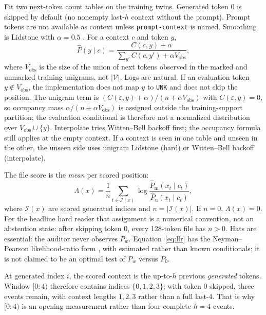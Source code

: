 \documentclass[11pt,a4paper]{article}
\theoremstyle{definition}
\newcommand{\V}{\mathcal{V}}
\newcommand{\LLR}{\Lambda}
\newcommand{\Phatm}{\hat{P}_{\mathrm{m}}}
\newcommand{\Phatu}{\hat{P}_{\mathrm{u}}}
\newcommand{\hist}{h}
\begin{document}
Fit two next-token count tables on the training twins. Generated token
$0$ is skipped by default (no nonempty last-$\hist$ context without the
prompt). Prompt tokens are not available as context unless
\texttt{prompt-context} is named. Smoothing is Lidstone with
$\alpha=0.5$ \citep{lidstone1920note}. For a context $c$ and token $y$,
\begin{equation}
\hat P(y \mid c)
= \frac{C(c,y)+\alpha}{\sum_{y'} C(c,y') + \alpha V_{\mathrm{obs}}},
\label{eq:lidstone}
\end{equation}
where $V_{\mathrm{obs}}$ is the size of the union of next tokens observed in the marked
and unmarked training unigrams, not $|\V|$. Logs are natural.
If an evaluation token $y\notin V_{\mathrm{obs}}$, the implementation does
not map $y$ to \texttt{UNK} and does not skip the position. The unigram
term is $(C(\varepsilon,y)+\alpha)/(n+\alpha V_{\mathrm{obs}})$ with
$C(\varepsilon,y)=0$, so occupancy mass $\alpha/(n+\alpha V_{\mathrm{obs}})$
is assigned outside the training-support partition; the evaluation
conditional is therefore not a normalized distribution over
$V_{\mathrm{obs}}\cup\{y\}$. Interpolate tries Witten--Bell backoff
first; the occupancy formula still applies at the empty context.
If a context is seen in one table and unseen in the other, the unseen side
uses unigram Lidstone (hard) or Witten--Bell backoff (interpolate).

The file score is the \emph{mean} per scored position:
\begin{equation}
\LLR(x)
= \frac{1}{n}\sum_{t \in \mathcal{I}(x)}
\log \frac{\Phatm(x_t \mid c_t)}{\Phatu(x_t \mid c_t)},
\label{eq:llr}
\end{equation}
where $\mathcal{I}(x)$ are scored generated indices and
$n=|\mathcal{I}(x)|$. If $n=0$, $\LLR(x)=0$. For the headline hard
reader that assignment is a numerical convention, not an abstention
state: after skipping token 0, every 128-token file has $n>0$. Hats are
essential: the auditor never observes $P_w$. Equation~\eqref{eq:llr}
has the Neyman--Pearson likelihood-ratio form
\citep{neyman1933most}, with estimated rather than known conditionals;
it is not claimed to be an optimal test of $P_w$ versus $P_0$.

At generated index $i$, the scored context is the up-to-$\hist$ previous
\emph{generated} tokens. Window $[0{:}4)$ therefore contains indices
$\{0,1,2,3\}$; with token 0 skipped, three events remain, with context
lengths $1,2,3$ rather than a full last-4. That is why $[0{:}4)$ is an
opening measurement rather than four complete $\hist=4$ events.
\end{document}

